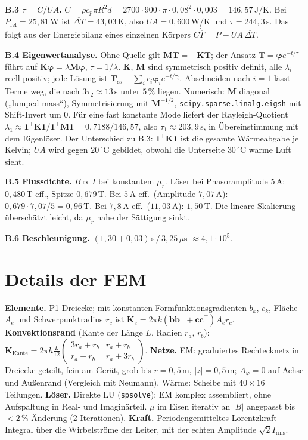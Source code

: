 \documentclass[a4paper, 10pt, conference]{ieeeconf}
\theoremstyle{remark}
\begin{document}
\textbf{B.3 $\tau=C/UA$.} $C=\rho c_p\pi R^2d=2700\cdot900\cdot\pi\cdot0{,}08^2\cdot0{,}003=146{,}57\,$J/K.
Bei $P_{\mathrm{ref}}=25{,}81\,$W ist $\overline{\Delta T}=43{,}03\,$K, also
$UA=0{,}600\,$W/K und $\tau=244{,}3\,$s. Das folgt aus der Energiebilanz
eines einzelnen Körpers $C\dot{\overline T}=P-UA\,\overline{\Delta T}$.

\textbf{B.4 Eigenwertanalyse.} Ohne Quelle gilt $\mathbf M\dot{\mathbf
T}=-\mathbf K\mathbf T$; der Ansatz $\mathbf T=\boldsymbol\varphi
e^{-t/\tau}$ führt auf $\mathbf K\boldsymbol\varphi=\lambda\mathbf
M\boldsymbol\varphi$, $\tau=1/\lambda$. $\mathbf K$, $\mathbf M$ sind
symmetrisch positiv definit, alle $\lambda_i$ reell positiv; jede Lösung
ist $\mathbf T_{\mathrm{ss}}+\sum_ic_i\boldsymbol\varphi_ie^{-t/\tau_i}$.
Abschneiden nach $i=1$ lässt Terme weg, die nach $3\tau_2\approx13\,$s
unter $5\,\%$ liegen. Numerisch: $\mathbf M$ diagonal („lumped mass“),
Symmetrisierung mit $\mathbf M^{-1/2}$, \texttt{scipy.sparse.linalg.eigsh}
mit Shift-Invert um $0$. Für eine fast konstante Mode liefert der
Rayleigh-Quotient $\lambda_1\approx\mathbf 1^{\!\top}\mathbf K\mathbf
1/\mathbf 1^{\!\top}\mathbf M\mathbf 1=0{,}7188/146{,}57$, also
$\tau_1\approx203{,}9\,$s, in Übereinstimmung mit dem Eigenlöser. Der
Unterschied zu B.3: $\mathbf 1^{\!\top}\mathbf K\mathbf 1$ ist die gesamte
Wärmeabgabe je Kelvin; $UA$ wird gegen $20\,^\circ$C gebildet, obwohl die
Unterseite $30\,^\circ$C warme Luft sieht.

\textbf{B.5 Flussdichte.} $B\propto I$ bei konstantem $\mu_r$. Löser bei
Phasoramplitude $5\,$A: $0{,}480\,$T eff., Spitze $0{,}679\,$T. Bei $5\,$A
eff.\ (Amplitude $7{,}07\,$A): $0{,}679\cdot7{,}07/5=0{,}96\,$T. Bei
$7{,}8\,$A eff.\ ($11{,}03\,$A): $1{,}50\,$T. Die lineare Skalierung
überschätzt leicht, da $\mu_r$ nahe der Sättigung sinkt.

\textbf{B.6 Beschleunigung.} $(1{,}30+0{,}03)\,$s$\,/\,3{,}25\,\mu$s
$\approx4{,}1\cdot10^5$.

\section{Details der FEM}
\label{app:fem}

\textbf{Elemente.} P1-Dreiecke; mit konstanten Formfunktionsgradienten
$b_k$, $c_k$, Fläche $A_e$ und Schwerpunktradius $r_c$ ist $\mathbf
K_e=2\pi k(\mathbf b\mathbf b^\top+\mathbf c\mathbf c^\top)A_er_c$.
\textbf{Konvektionsrand} (Kante der Länge $L$, Radien $r_a$, $r_b$):
$\mathbf K_{\mathrm{Kante}}=2\pi h\frac{L}{12}\begin{pmatrix}3r_a+r_b&r_a+r_b\\r_a+r_b&r_a+3r_b\end{pmatrix}$.
\textbf{Netze.} EM: graduiertes Rechtecknetz in Dreiecke geteilt, fein am
Gerät, grob bis $r=0{,}5\,$m, $|z|=0{,}5\,$m; $A_\varphi=0$ auf Achse und
Außenrand (Vergleich mit Neumann). Wärme: Scheibe mit $40\times16$
Teilungen. \textbf{Löser.} Direkte LU (\texttt{spsolve}); EM komplex
assembliert, ohne Aufspaltung in Real- und Imaginärteil. $\mu$ im Eisen
iterativ an $|B|$ angepasst bis $<2\,\%$ Änderung (2 Iterationen).
\textbf{Kraft.} Periodengemitteltes Lorentzkraft-Integral über die
Wirbelströme der Leiter, mit der echten Amplitude $\sqrt2I_{\mathrm{rms}}$.
\end{document}
